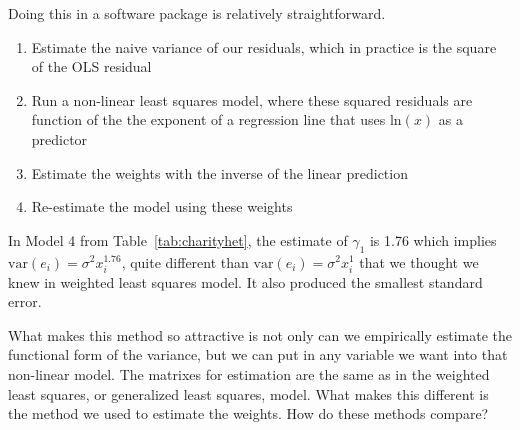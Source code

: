 Doing this in a software package is relatively straightforward.
\begin{enumerate}
\item Estimate the naive variance of our residuals, which in practice is the square of the OLS residual
\item Run a non-linear least squares model, where these squared residuals are function of the the exponent of a regression line that uses $\mbox{ln}\left(x\right)$ as a predictor
\item Estimate the weights with the inverse of the linear prediction
\item Re-estimate the model using these weights
\end{enumerate}

In Model 4 from Table~\ref{tab:charityhet}, the estimate of $\gamma_1$ is 1.76 which implies $\mbox{var}\left(e_i\right)=\sigma^2x_i^{1.76}$, quite different than $\mbox{var}\left(e_i\right)=\sigma^2x_i^{1}$ that we thought we knew in weighted least squares model. It also produced the smallest standard error.

What makes this method so attractive is not only can we empirically estimate the functional form of the variance, but we can put in any variable we want into that non-linear model. The matrixes for estimation are the same as in the weighted least squares, or generalized least squares, model. What makes this different is the method we used to estimate the weights.
How do these methods compare?


